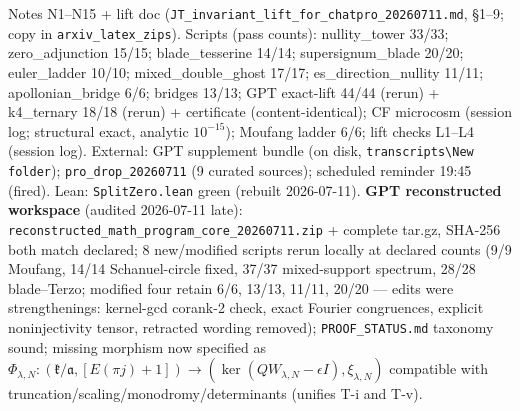 \documentclass[10pt]{article}
\begin{document}
Notes N1--N15 + lift doc (\texttt{JT\_invariant\_lift\_for\_chatpro\_20260711.md}, \S1--9; copy in \texttt{arxiv\_latex\_zips}). Scripts (pass counts): nullity\_tower 33/33; zero\_adjunction 15/15; blade\_tesserine 14/14; supersignum\_blade 20/20; euler\_ladder 10/10; mixed\_double\_ghost 17/17; es\_direction\_nullity 11/11; apollonian\_bridge 6/6; bridges 13/13; GPT exact-lift 44/44 (rerun) + k4\_ternary 18/18 (rerun) + certificate (content-identical); CF microcosm (session log; structural exact, analytic $10^{-15}$); Moufang ladder 6/6; lift checks L1--L4 (session log). External: GPT supplement bundle (on disk, \texttt{transcripts\textbackslash New folder}); \texttt{pro\_drop\_20260711} (9 curated sources); scheduled reminder 19:45 (fired). Lean: \texttt{SplitZero.lean} green (rebuilt 2026-07-11). \textbf{GPT reconstructed workspace} (audited 2026-07-11 late): \texttt{reconstructed\_math\_program\_core\_20260711.zip} + complete tar.gz, SHA-256 both match declared; 8 new/modified scripts rerun locally at declared counts (9/9 Moufang, 14/14 Schanuel-circle fixed, 37/37 mixed-support spectrum, 28/28 blade--Terzo; modified four retain 6/6, 13/13, 11/11, 20/20 --- edits were strengthenings: kernel-gcd corank-2 check, exact Fourier congruences, explicit noninjectivity tensor, retracted wording removed); \texttt{PROOF\_STATUS.md} taxonomy sound; missing morphism now specified as $\Phi_{\lambda,N}:(\mathfrak k/\mathfrak a,[E(\pi j)+1])\to(\ker(QW_{\lambda,N}-\epsilon I),\xi_{\lambda,N})$ compatible with truncation/scaling/monodromy/determinants (unifies T-i and T-v).
\end{document}
